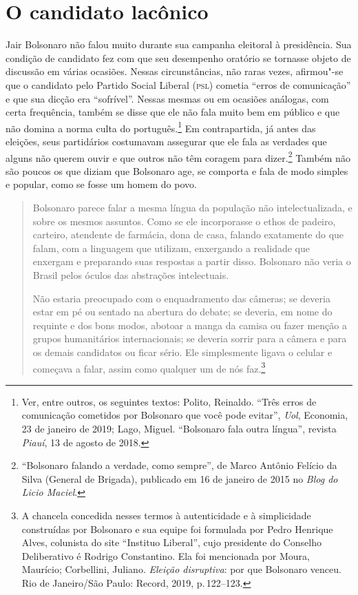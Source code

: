 \section{O candidato lacônico}

Jair Bolsonaro não falou muito durante sua campanha eleitoral à
presidência. Sua condição de candidato fez com que seu desempenho
oratório se tornasse objeto de discussão em várias ocasiões. Nessas
circunstâncias, não raras vezes, afirmou"-se que o candidato pelo Partido
Social Liberal (\textsc{psl}) cometia ``erros de comunicação'' e que sua dicção
era ``sofrível''. Nessas mesmas ou em ocasiões análogas, com certa
frequência, também se disse que ele não fala muito bem em público e que
não domina a norma culta do português.\footnote{Ver, entre outros, os
  seguintes textos: Polito, Reinaldo. ``Três erros de comunicação
  cometidos por Bolsonaro que você pode evitar'', \textit{Uol}, Economia, 23 de janeiro de 2019; Lago, Miguel. ``Bolsonaro fala outra língua'', revista \textit{Piauí}, 13 de agosto de 2018.} Em contrapartida, já antes das eleições, seus partidários
costumavam assegurar que ele fala as verdades que alguns não querem
ouvir e que outros não têm coragem para dizer.\footnote{``Bolsonaro
  falando a verdade, como sempre'', de Marco Antônio Felício da Silva
  (General de Brigada), publicado em 16 de janeiro de 2015 no
  \emph{Blog do Licio Maciel}.}
Também não são poucos os que diziam que Bolsonaro age, se comporta e
fala de modo simples e popular, como se fosse um homem do povo.

\begin{quote}
Bolsonaro parece falar a mesma língua da população não intelectualizada,
e sobre os mesmos assuntos. Como se ele incorporasse o ethos de padeiro,
carteiro, atendente de farmácia, dona de casa, falando exatamente do que
falam, com a linguagem que utilizam, enxergando a realidade que enxergam
e preparando suas respostas a partir disso. Bolsonaro não veria o Brasil
pelos óculos das abstrações intelectuais.

Não estaria preocupado com o enquadramento das câmeras; se deveria estar
em pé ou sentado na abertura do debate; se deveria, em nome do requinte
e dos bons modos, abotoar a manga da camisa ou fazer menção a grupos
humanitários internacionais; se deveria sorrir para a câmera e para os
demais candidatos ou ficar sério. Ele simplesmente ligava o celular e
começava a falar, assim como qualquer um de nós faz.\footnote{A
  chancela concedida nesses termos à autenticidade e à simplicidade
  construídas por Bolsonaro e sua equipe foi formulada por Pedro
  Henrique Alves, colunista do site ``Instituo Liberal'', cujo
  presidente do Conselho Deliberativo é Rodrigo Constantino. Ela foi
  mencionada por Moura, Maurício; Corbellini, Juliano. \emph{Eleição
  disruptiva}: por que Bolsonaro venceu. Rio de Janeiro/São Paulo:
  Record, 2019, p.\,122--123.}
\end{quote}

